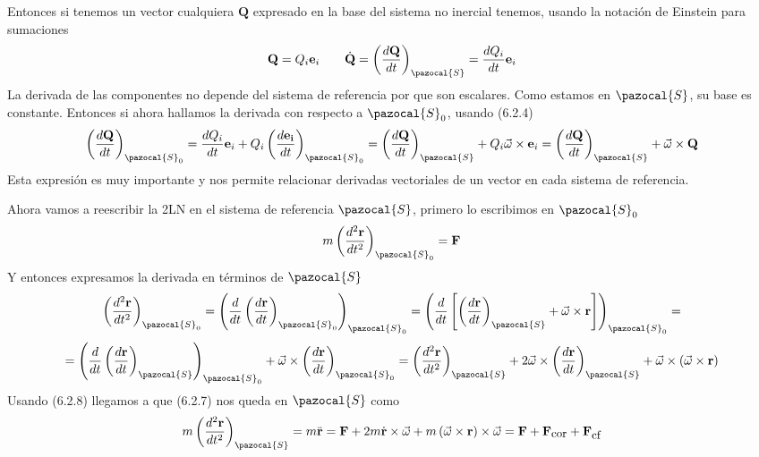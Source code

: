 Entonces si tenemos un vector cualquiera $\mathbf{Q}$ expresado en la base del sistema no inercial tenemos, usando la notación de Einstein para sumaciones
\begin{equation} \label{6.1.1}
    \mathbf{Q}=Q_i \mathbf{e}_i \ \ \ \ \ \ \dot{\mathbf{Q}}=\left(\frac{d \mathbf{Q}}{dt}\right)_\pazocal{S} = \frac{d Q_i}{dt} \mathbf{e}_i
    \end{equation} 
La derivada de las componentes no depende del sistema de referencia por que son escalares. Como estamos en $\pazocal{S}$, su base es constante. Entonces si ahora hallamos la derivada con respecto a $\pazocal{S}_0$, usando (6.2.4)
\begin{equation} \label{6.1.1}
    \left(\frac{d \mathbf{Q}}{dt}\right)_{\pazocal{S}_0} = \frac{d Q_i}{dt} \mathbf{e}_i + Q_i \left(\frac{d \mathbf{e_i}}{dt}\right)_{\pazocal{S}_0} = \left(\frac{d \mathbf{Q}}{dt}\right)_\pazocal{S} + Q_i \vec{\omega} \times \mathbf{e}_i = \left(\frac{d \mathbf{Q}}{dt}\right)_\pazocal{S} + \vec{\omega} \times \mathbf{Q}
    \end{equation} 
Esta expresión es muy importante y nos permite relacionar derivadas vectoriales de un vector en cada sistema de referencia.

Ahora vamos a reescribir la 2LN en el sistema de referencia $\pazocal{S}$, primero lo escribimos en $\pazocal{S}_0$
\begin{equation} \label{6.1.1}
    m\left(\frac{d^2 \mathbf{r}}{dt^2}\right)_{\pazocal{S}_0}= \mathbf{F}
    \end{equation} 
Y entonces expresamos la derivada en términos de $\pazocal{S}$
\[
    \left(\frac{d^2 \mathbf{r}}{dt^2}\right)_{\pazocal{S}_0}= \left(\frac{d}{dt}\left(\frac{d \mathbf{r}}{dt}\right)_{\pazocal{S}_0}\right)_{\pazocal{S}_0} = \left(\frac{d}{dt}\left[\left(\frac{d \mathbf{r}}{dt}\right)_\pazocal{S} + \vec{\omega} \times \mathbf{r}\right]\right)_{\pazocal{S}_0}=
    \]
\begin{equation} \label{6.1.1}
    = \left(\frac{d}{dt}\left(\frac{d \mathbf{r}}{dt}\right)_\pazocal{S}\right)_{\pazocal{S}_0} + \vec{\omega} \times \left(\frac{d\mathbf{r}}{dt}\right)_{\pazocal{S}_0} = \left(\frac{d^2 \mathbf{r}}{dt^2}\right)_\pazocal{S} + 2\vec{\omega} \times \left(\frac{d \mathbf{r}}{dt}\right)_\pazocal{S} + \vec{\omega} \times \left(\vec{\omega} \times \mathbf{r}\right)
    \end{equation} 
Usando (6.2.8) llegamos a que (6.2.7) nos queda en $\pazocal{S}$ como
\begin{equation} \label{6.1.1}
    m\left(\frac{d^2 \mathbf{r}}{dt^2}\right)_{\pazocal{S}}= m\ddot{\mathbf{r}}=  \mathbf{F} + 2 m \dot{\mathbf{r}} \times  \vec{\omega} + m\left(\vec{\omega} \times \mathbf{r}\right) \times \vec{\omega} = \mathbf{F} + \mathbf{F}_{\mbox{\small cor}} + \mathbf{F}_{\mbox{\small cf}}
    \end{equation} 

